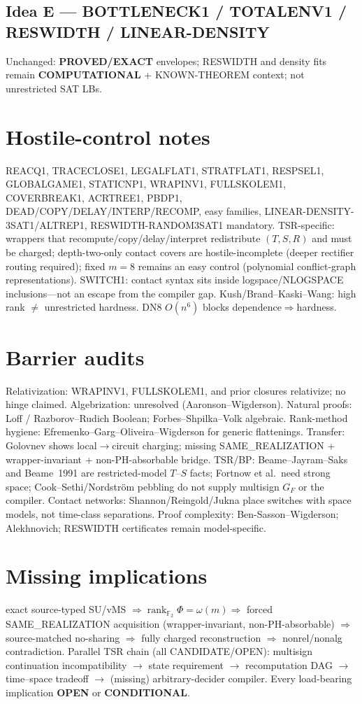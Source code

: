 \documentclass[11pt]{article}
\begin{document}
\subsection*{Idea E --- BOTTLENECK1 / TOTALENV1 / RESWIDTH / LINEAR-DENSITY}
Unchanged: \textbf{PROVED/EXACT} envelopes; RESWIDTH and density fits remain \textbf{COMPUTATIONAL} + KNOWN-THEOREM context; not unrestricted SAT LBs.

\section*{Hostile-control notes}
REACQ1, TRACECLOSE1, LEGALFLAT1, STRATFLAT1, RESPSEL1, GLOBALGAME1, STATICNP1, WRAPINV1,
FULLSKOLEM1, COVERBREAK1, ACRTREE1, PBDP1, DEAD/COPY/DELAY/INTERP/RECOMP, easy families,
LINEAR-DENSITY-3SAT1/ALTREP1, RESWIDTH-RANDOM3SAT1 mandatory.
TSR-specific: wrappers that recompute/copy/delay/interpret redistribute $(T,S,R)$ and must be charged;
depth-two-only contact covers are hostile-incomplete (deeper rectifier routing required);
fixed $m=8$ remains an easy control (polynomial conflict-graph representations).
SWITCH1: contact syntax sits inside logspace/NLOGSPACE inclusions---not an escape from the compiler gap.
Kush/Brand--Kaski--Wang: high rank $\neq$ unrestricted hardness.
DN8 $O(n^6)$ blocks dependence$\Rightarrow$hardness.

\section*{Barrier audits}
Relativization: WRAPINV1, FULLSKOLEM1, and prior closures relativize; no hinge claimed.
Algebrization: unresolved (Aaronson--Wigderson).
Natural proofs: Loff / Razborov--Rudich Boolean; Forbes--Shpilka--Volk algebraic.
Rank-method hygiene: Efremenko--Garg--Oliveira--Wigderson for generic flattenings.
Transfer: Golovnev shows local$\to$circuit charging; missing SAME\_REALIZATION + wrapper-invariant + non-PH-absorbable bridge.
TSR/BP: Beame--Jayram--Saks and Beame~1991 are restricted-model $T$--$S$ facts; Fortnow et al.\ need strong space; Cook--Sethi/Nordstr\"om pebbling do not supply multisign $G_F$ or the compiler.
Contact networks: Shannon/Reingold/Jukna place switches with space models, not time-class separations.
Proof complexity: Ben-Sasson--Wigderson; Alekhnovich; RESWIDTH certificates remain model-specific.

\section*{Missing implications}
exact source-typed SU/vMS $\Rightarrow\operatorname{rank}_{\mathbb F_2}\Phi=\omega(m)
\Rightarrow$ forced SAME\_REALIZATION acquisition (wrapper-invariant, non-PH-absorbable)
$\Rightarrow$ source-matched no-sharing $\Rightarrow$ fully charged reconstruction
$\Rightarrow$ nonrel/nonalg contradiction.
Parallel TSR chain (all CANDIDATE/OPEN):
multisign continuation incompatibility $\to$ state requirement $\to$ recomputation DAG
$\to$ time--space tradeoff $\to$ (missing) arbitrary-decider compiler.
Every load-bearing implication \textbf{OPEN} or \textbf{CONDITIONAL}.
\end{document}
